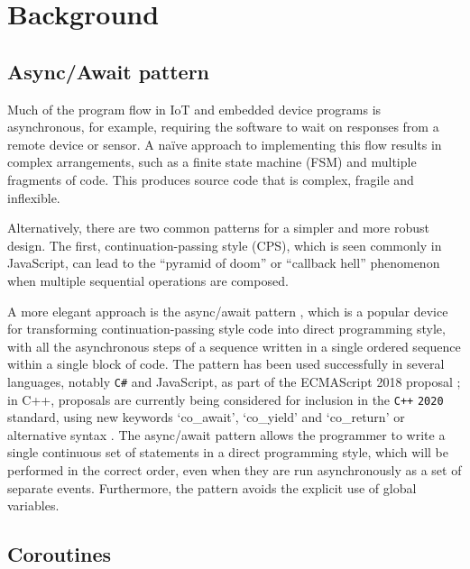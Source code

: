 \section{Background\DIFdelbegin {}\DIFdelend }
\label{section:background}

\subsection{Async/Await pattern}

Much of the program flow in IoT and embedded device programs is asynchronous, for example, requiring the software to wait on responses from a remote device or sensor. A naïve approach to implementing this flow results in complex arrangements, such as a finite state machine (FSM) and multiple fragments of code. This produces source code that is complex, fragile and inflexible.

Alternatively, there are two common patterns for a simpler and more robust design. The first, continuation-passing style (CPS), which is seen commonly in JavaScript, can lead to the “pyramid of doom” or “callback hell” phenomenon \cite{Brodu2015, Edwards2009, Madsen2017, Kambona2013} when multiple sequential operations are composed.

A more elegant approach is the async/await pattern \cite{Bierman2012, Haller2016, Okur2014, Syme2011}, which is a popular device for transforming continuation-passing style code into direct programming style, with all the asynchronous steps of a sequence written in a single ordered sequence within a single block of code. The pattern has been used successfully in several languages, notably \verb!C#! \cite{Bierman2012, Okur2014} and JavaScript, as part of the ECMAScript 2018 proposal \cite{ECMA2017}; in C++, proposals are currently being considered for inclusion in the \verb!C++! \verb!2020! standard, using new keywords ‘co\_await’, ‘co\_yield’ and ‘co\_return’ or alternative syntax \cite{ISO2017, Romer2018}. The async/await pattern allows the programmer to write a single continuous set of statements in a direct programming style, which will be performed in the correct order, even when they are run asynchronously as a set of separate events. Furthermore, the pattern avoids the explicit use of global variables.

\subsection{Coroutines}

